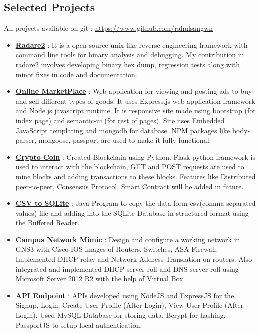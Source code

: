 \documentclass[margin, centered]{res}
\begin{document}
\begin{resume}
\section{Selected Projects}
All projects available on git : \url{https://www.github.com/rahulsangwn}
\begin{itemize}[leftmargin=*]
 \item \textbf{\href{https://github.com/rahulsangwn/radare2}{Radare2}} : It is a open source unix-like reverse engineering framework with command line tools for binary analysis and debugging. My contribution in radare2 involves developing binary hex dump, regression tests along with minor fixes in code and documentation.
 \item \textbf{\href{https://github.com/rahulsangwn/OnlineMarketPlace}{Online MarketPlace}} : Web application for viewing and posting ads to buy and sell different types of goods. It uses Express.js web application framework and Node.js javascript runtime. It is responsive site made using bootstrap (for index page) and semantic-ui (for rest of pages). Site uses Embedded JavaScript templating and mongodb for database. NPM packages like body-parser, mongoose, passport are used to make it fully functional.
 \item \textbf{\href{https://github.com/rahulsangwn/Crptro-Coin}{Crypto Coin}} : Created Blockchain using Python. Flask python framework is used to interact with the blockchain, GET and POST requests are used to mine blocks and adding transactions to these blocks. Features like Distributed peer-to-peer, Consensus Protocol, Smart Contract will be added in future.
 \item \textbf{\href{https://github.com/rahulsangwn/CSVtoSQLite}{CSV to SQLite}} : Java Program to copy the data form csv(comma-separated values) file and adding into the SQLite Database in structured format using the Buffered Reader.
 \item \textbf{Campus Network Mimic} : Design and configure a working network in GNS3 with Cisco IOS images of Routers, Switches, ASA Firewall. Implemented DHCP relay and Network Address Translation on routers. Also integrated and implemented DHCP server roll and DNS server roll using Microsoft Server 2012 R2 with the help of Virtual Box.
 \item \textbf{\href{https://github.com/rahulsangwn/API-Endpoints}{API Endpoint}} : APIs developed using NodeJS and ExpressJS  for the Signup, Login, Create User Profile (After Login), View User Profile (After Login). Used MySQL Database for storing data, Bcrypt for hashing, PassportJS to setup local authentication.


\end{itemize}
\end{resume}
\end{document}
